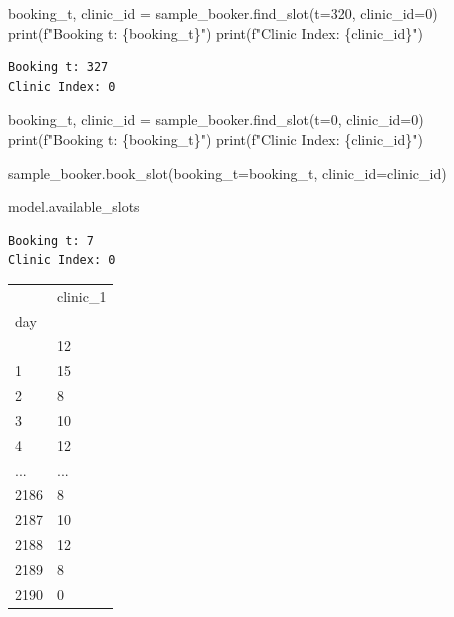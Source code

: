 \documentclass[
  letterpaper,
  DIV=11,
  numbers=noendperiod]{scrreprt}
\newenvironment{Shaded}{\begin{snugshade}}{\end{snugshade}}
\newcommand{\BuiltInTok}[1]{\textcolor[rgb]{0.00,0.23,0.31}{#1}}
\newcommand{\DecValTok}[1]{\textcolor[rgb]{0.68,0.00,0.00}{#1}}
\newcommand{\NormalTok}[1]{\textcolor[rgb]{0.00,0.23,0.31}{#1}}
\newcommand{\OperatorTok}[1]{\textcolor[rgb]{0.37,0.37,0.37}{#1}}
\newcommand{\SpecialCharTok}[1]{\textcolor[rgb]{0.37,0.37,0.37}{#1}}
\newcommand{\SpecialStringTok}[1]{\textcolor[rgb]{0.13,0.47,0.30}{#1}}
\begin{document}
\begin{Shaded}
\begin{Highlighting}[]
\NormalTok{booking\_t, clinic\_id }\OperatorTok{=}\NormalTok{ sample\_booker.find\_slot(t}\OperatorTok{=}\DecValTok{320}\NormalTok{, clinic\_id}\OperatorTok{=}\DecValTok{0}\NormalTok{)}
\BuiltInTok{print}\NormalTok{(}\SpecialStringTok{f"Booking t: }\SpecialCharTok{\{}\NormalTok{booking\_t}\SpecialCharTok{\}}\SpecialStringTok{"}\NormalTok{)}
\BuiltInTok{print}\NormalTok{(}\SpecialStringTok{f"Clinic Index: }\SpecialCharTok{\{}\NormalTok{clinic\_id}\SpecialCharTok{\}}\SpecialStringTok{"}\NormalTok{)}
\end{Highlighting}
\end{Shaded}

\begin{verbatim}
Booking t: 327
Clinic Index: 0
\end{verbatim}

\begin{Shaded}
\begin{Highlighting}[]
\NormalTok{booking\_t, clinic\_id }\OperatorTok{=}\NormalTok{ sample\_booker.find\_slot(t}\OperatorTok{=}\DecValTok{0}\NormalTok{, clinic\_id}\OperatorTok{=}\DecValTok{0}\NormalTok{)}
\BuiltInTok{print}\NormalTok{(}\SpecialStringTok{f"Booking t: }\SpecialCharTok{\{}\NormalTok{booking\_t}\SpecialCharTok{\}}\SpecialStringTok{"}\NormalTok{)}
\BuiltInTok{print}\NormalTok{(}\SpecialStringTok{f"Clinic Index: }\SpecialCharTok{\{}\NormalTok{clinic\_id}\SpecialCharTok{\}}\SpecialStringTok{"}\NormalTok{)}

\NormalTok{sample\_booker.book\_slot(booking\_t}\OperatorTok{=}\NormalTok{booking\_t, clinic\_id}\OperatorTok{=}\NormalTok{clinic\_id)}

\NormalTok{model.available\_slots}
\end{Highlighting}
\end{Shaded}

\begin{verbatim}
Booking t: 7
Clinic Index: 0
\end{verbatim}

\begin{longtable}[]{@{}ll@{}}
\toprule\noalign{}
& clinic\_1 \\
day & \\
\midrule\noalign{}
\endhead
\bottomrule\noalign{}
\endlastfoot
0 & 12 \\
1 & 15 \\
2 & 8 \\
3 & 10 \\
4 & 12 \\
... & ... \\
2186 & 8 \\
2187 & 10 \\
2188 & 12 \\
2189 & 8 \\
2190 & 0 \\
\end{longtable}
\end{document}
